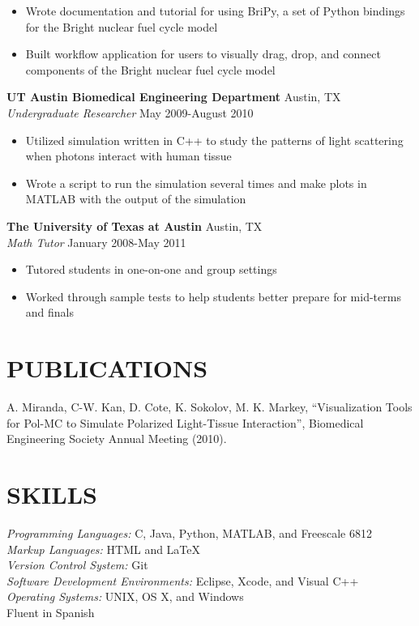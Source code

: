 \documentclass[line,margin]{res}
\begin{document}
\begin{resume}
\begin{itemize}
    \item Wrote documentation and tutorial for using BriPy, a set of Python
    bindings for the Bright nuclear fuel cycle model
    \item Built workflow application for users to visually drag, drop, and 
    connect components of the Bright nuclear fuel cycle model
  \end{itemize}
  {\bf UT Austin Biomedical Engineering Department} \hfill Austin, TX \\
  \emph{Undergraduate Researcher} \hfill May 2009-August 2010
  \begin{itemize} \itemsep -2pt
    \item Utilized simulation written in C++ to study the patterns of light 
    scattering when photons interact with human tissue
    \item Wrote a script to run the simulation several times and make plots in 
    MATLAB with the output of the simulation
  \end{itemize}
  {\bf The University of Texas at Austin} \hfill Austin, TX \\
  \emph{Math Tutor} \hfill January 2008-May 2011
  \begin{itemize} \itemsep -2pt
    \item Tutored students in one-on-one and group settings
    \item Worked through sample tests to help students better prepare for 
    mid-terms and finals
  \end{itemize}
 
\section{PUBLICATIONS} 
  A. Miranda, C-W. Kan, D. Cote, K. Sokolov, M. K. Markey, ``Visualization 
  Tools for Pol-MC to Simulate Polarized Light-Tissue Interaction'', 
  Biomedical Engineering Society Annual Meeting (2010).

\section{SKILLS}
  \emph{Programming Languages:} C, Java, Python, MATLAB, and Freescale 6812 \\
  \emph{Markup Languages:} HTML and \LaTeX \\
  \emph{Version Control System:} Git \\
  \emph{Software Development Environments:} Eclipse, Xcode, and Visual C++ \\
  \emph{Operating Systems:} UNIX, OS X, and Windows \\
  Fluent in Spanish

\end{resume}
\end{document}
